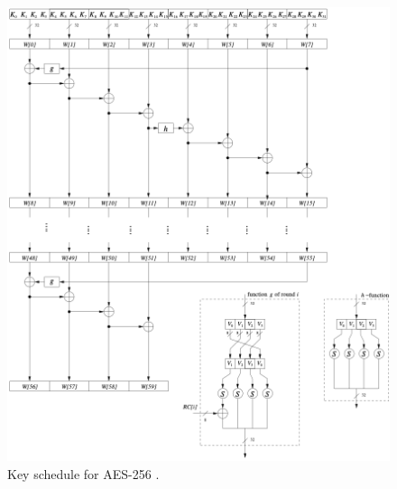 \begin{figure}[!ht]
    \centering
    \includegraphics[width=\textwidth]{img/key-schedule-256.png}
    \caption{Key schedule for AES-256 \cite{Paar2024}.}
    \label{fig:key-schedule-256}
\end{figure}